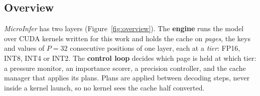 \documentclass{article}
\begin{document}
\subsection{Overview}
\label{sec:overview}

\textit{MicroInfer} has two layers (Figure~\ref{fig:overview}). The
\textbf{engine} runs the model over CUDA kernels written for this work and
holds the cache on \textit{pages}, the keys and values of $P = 32$ consecutive
positions of one layer, each at a \textit{tier}: FP16, INT8, INT4 or INT2. The
\textbf{control loop} decides which page is held at which tier: a pressure
monitor, an importance scorer, a precision controller, and the cache manager
that applies its plans. Plans are applied between decoding steps, never inside
a kernel launch, so no kernel sees the cache half converted.
\end{document}
